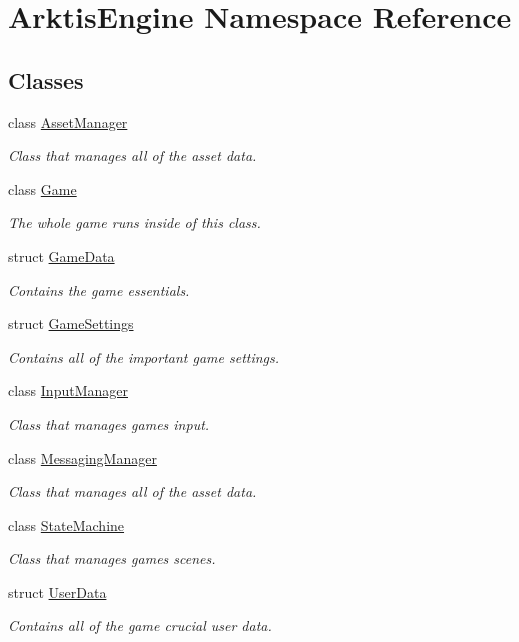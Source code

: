 \hypertarget{namespace_arktis_engine}{}\section{Arktis\+Engine Namespace Reference}
\label{namespace_arktis_engine}
\subsection*{Classes}
\begin{DoxyCompactItemize}
\item 
class \mbox{\hyperlink{class_arktis_engine_1_1_asset_manager}{Asset\+Manager}}
\begin{DoxyCompactList}\small\item\em Class that manages all of the asset data. \end{DoxyCompactList}\item 
class \mbox{\hyperlink{class_arktis_engine_1_1_game}{Game}}
\begin{DoxyCompactList}\small\item\em The whole game runs inside of this class. \end{DoxyCompactList}\item 
struct \mbox{\hyperlink{struct_arktis_engine_1_1_game_data}{Game\+Data}}
\begin{DoxyCompactList}\small\item\em Contains the game essentials. \end{DoxyCompactList}\item 
struct \mbox{\hyperlink{struct_arktis_engine_1_1_game_settings}{Game\+Settings}}
\begin{DoxyCompactList}\small\item\em Contains all of the important game settings. \end{DoxyCompactList}\item 
class \mbox{\hyperlink{class_arktis_engine_1_1_input_manager}{Input\+Manager}}
\begin{DoxyCompactList}\small\item\em Class that manages game\textquotesingle{}s input. \end{DoxyCompactList}\item 
class \mbox{\hyperlink{class_arktis_engine_1_1_messaging_manager}{Messaging\+Manager}}
\begin{DoxyCompactList}\small\item\em Class that manages all of the asset data. \end{DoxyCompactList}\item 
class \mbox{\hyperlink{class_arktis_engine_1_1_state_machine}{State\+Machine}}
\begin{DoxyCompactList}\small\item\em Class that manages game\textquotesingle{}s scenes. \end{DoxyCompactList}\item 
struct \mbox{\hyperlink{struct_arktis_engine_1_1_user_data}{User\+Data}}
\begin{DoxyCompactList}\small\item\em Contains all of the game crucial user data. \end{DoxyCompactList}\end{DoxyCompactItemize}
